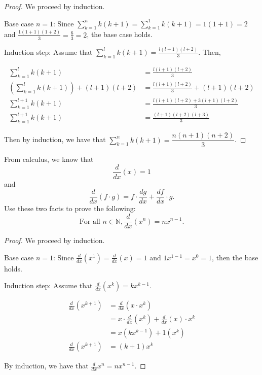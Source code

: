 \documentclass[12 pt]{exam}
\begin{document}
\begin{questions}
\begin{solution}\begin{proof}
We proceed by induction.

Base case $n=1$: Since $\sum_{k=1}^n k(k+1) = \sum_{k=1}^1 k(k+1) = 1(1+1) = 2$
and $\frac{1(1+1)(1+2)}{3} = \frac{6}{3} = 2$, the base case holds.

Induction step: Assume that $\sum_{k=1}^l k(k+1) = \frac{l(l+1)(l+2)}{3}$. Then,

\begin{align*}
    \sum_{k=1}^l k(k+1) &= \frac{l(l+1)(l+2)}{3} \\
    \left ( \sum_{k=1}^l k(k+1) \right ) + (l+1)(l+2) &= \frac{l(l+1)(l+2)}{3} + (l+1)(l+2) \\
    \sum_{k=1}^{l+1} k(k+1) &= \frac{l(l+1)(l+2) + 3(l+1)(l+2)}{3} \\
    \sum_{k=1}^{l+1} k(k+1) &= \frac{(l+1)(l+2)(l+3)}{3}
\end{align*}

Then by induction, we have that $\sum_{k=1}^n k(k+1) = \dfrac{n(n+1)(n+2)}{3}$.

\end{proof}\end{solution}


\question From calculus, we know that
\[ \frac{d}{dx}(x) = 1 \]
and
\[ \frac{d}{dx}(f\cdot g) = f \cdot \frac{dg}{dx} + \frac{df}{dx} \cdot g. \]
Use these two facts to prove the following:
\[ \text{For all } n \in \mathbb{N}, \frac{d}{dx}(x^n) = nx^{n-1}. \]

\begin{solution}\begin{proof}
We proceed by induction.

Base case $n=1$: Since $\frac{d}{dx}(x^1) = \frac{d}{dx}(x) = 1$ and $1x^{1-1} = x^0 = 1$,
then the base holds.

Induction step: Assume that $\frac{d}{dx}(x^k) = k x^{k-1}$.

\begin{align*}
    \frac{d}{dx}(x^{k+1}) &= \frac{d}{dx}(x \cdot x^k) \\
                          &= x \cdot \frac{d}{dx}(x^k) + \frac{d}{dx}(x) \cdot x^k \\
                          &= x (k x^{k-1}) + 1 (x^k) \\
    \frac{d}{dx}(x^{k+1}) &= (k+1) x^k
\end{align*}

By induction, we have that $\frac{d}{dx}x^n = n x^{n-1}$.


\end{proof}
\end{solution}
\end{questions}
\end{document}
